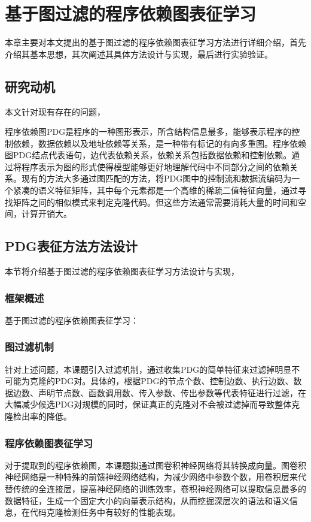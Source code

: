 \chapter{基于图过滤的程序依赖图表征学习}
\label{chap:PDG}
本章主要对本文提出的基于图过滤的程序依赖图表征学习方法进行详细介绍，首先介绍其基本思想，其次阐述其具体方法设计与实现，最后进行实验验证。
\section{研究动机}
本文针对现有存在的问题，

程序依赖图PDG是程序的一种图形表示，所含结构信息最多，能够表示程序的控制依赖，数据依赖以及地址依赖等关系，是一种带有标记的有向多重图。程序依赖图PDG结点代表语句，边代表依赖关系，依赖关系包括数据依赖和控制依赖。通过将程序表示为图的形式使得模型能够更好地理解代码中不同部分之间的依赖关系。现有的方法大多通过图匹配的方法，将PDG图中的控制流和数据流编码为一个紧凑的语义特征矩阵，其中每个元素都是一个高维的稀疏二值特征向量，通过寻找矩阵之间的相似模式来判定克隆代码。但这些方法通常需要消耗大量的时间和空间，计算开销大。
\section{PDG表征方法方法设计}
本节将介绍基于图过滤的程序依赖图表征学习方法设计与实现， 

\subsection{框架概述}
基于图过滤的程序依赖图表征学习：

\subsection{图过滤机制}
针对上述问题，本课题引入过滤机制，通过收集PDG的简单特征来过滤掉明显不可能为克隆的PDG对。具体的，根据PDG的节点个数、控制边数、执行边数、数据边数、声明节点数、函数调用数、传入参数、传出参数等代表特征进行过滤，在大幅减少候选PDG对规模的同时，保证真正的克隆对不会被过滤掉而导致整体克隆检出率的降低。

\subsection{程序依赖图表征学习}
对于提取到的程序依赖图，本课题拟通过图卷积神经网络将其转换成向量。图卷积神经网络是一种特殊的前馈神经网络结构，为减少网络中参数个数，用卷积层来代替传统的全连接层，提高神经网络的训练效率，卷积神经网络可以提取信息最多的数据特征，生成一个固定大小的向量表示结构，从而挖掘深层次的语法和语义信息，在代码克隆检测任务中有较好的性能表现。


